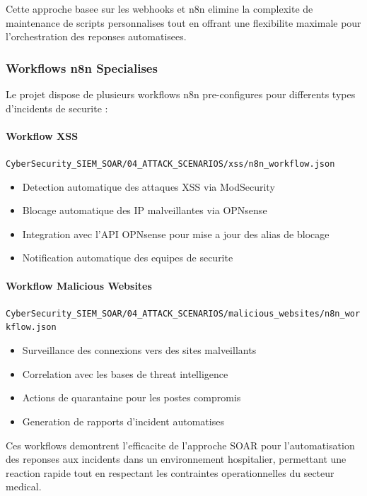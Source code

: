 Cette approche basee sur les webhooks et n8n elimine la complexite de maintenance de scripts personnalises tout en offrant une flexibilite maximale pour l'orchestration des reponses automatisees.

\subsubsection{Workflows n8n Specialises}

Le projet dispose de plusieurs workflows n8n pre-configures pour differents types d'incidents de securite :

\paragraph{Workflow XSS}
\texttt{CyberSecurity\_SIEM\_SOAR/04\_ATTACK\_SCENARIOS/xss/n8n\_workflow.json}
\begin{itemize}
    \item Detection automatique des attaques XSS via ModSecurity
    \item Blocage automatique des IP malveillantes via OPNsense
    \item Integration avec l'API OPNsense pour mise a jour des alias de blocage
    \item Notification automatique des equipes de securite
\end{itemize}

\paragraph{Workflow Malicious Websites}
\texttt{CyberSecurity\_SIEM\_SOAR/04\_ATTACK\_SCENARIOS/malicious\_websites/n8n\_workflow.json}
\begin{itemize}
    \item Surveillance des connexions vers des sites malveillants
    \item Correlation avec les bases de threat intelligence
    \item Actions de quarantaine pour les postes compromis
    \item Generation de rapports d'incident automatises
\end{itemize}

Ces workflows demontrent l'efficacite de l'approche SOAR pour l'automatisation des reponses aux incidents dans un environnement hospitalier, permettant une reaction rapide tout en respectant les contraintes operationnelles du secteur medical.

